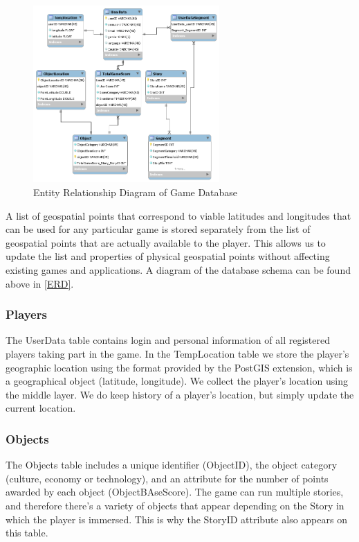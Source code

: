 \documentclass[conference]{IEEEtran}
\begin{document}
\begin{figure}[h]
\centering
\includegraphics[width=2.8in]{imgs/DatabaseSchema.png}
\caption{Entity Relationship Diagram of Game Database}
\label{ERD}
\end{figure}

A list of geospatial points that correspond to viable latitudes and longitudes that can be used for any particular game is stored separately from the list of geospatial points that are actually available to the player. This allows us to update the list and properties of physical geospatial points without affecting existing games and applications. A diagram of the database schema can be found above in \autoref{ERD}. 

\subsubsection*{Players}
The UserData table contains login and personal information of all registered players taking part in the game. In the TempLocation table we store the player’s geographic location using the format provided by the PostGIS extension, which is a geographical object (latitude, longitude). We collect the player's location using the middle layer. We do keep history of a player’s location, but simply update the current location.

\subsubsection*{Objects}
The Objects table includes a unique identifier (ObjectID), the object category (culture, economy or technology), and an attribute for the number of points awarded by each object (ObjectBAseScore). The game can run multiple stories, and therefore there’s a variety of objects that appear depending on the Story in which the player is immersed. This is why the StoryID attribute also appears on this table. 
\end{document}
